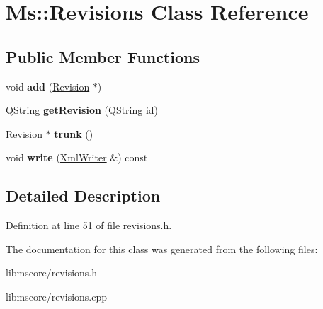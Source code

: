 \hypertarget{class_ms_1_1_revisions}{}\section{Ms\+:\+:Revisions Class Reference}
\label{class_ms_1_1_revisions}
\subsection*{Public Member Functions}
\begin{DoxyCompactItemize}
\item 
\mbox{\label{class_ms_1_1_revisions_a3e50dc594a0bae8e14b0695d8f1fc1d8}} 
void {\bfseries add} (\hyperlink{class_ms_1_1_revision}{Revision} $\ast$)
\item 
\mbox{\label{class_ms_1_1_revisions_a9f5859687be2cd3c0afe5a58cd31fb4d}} 
Q\+String {\bfseries get\+Revision} (Q\+String id)
\item 
\mbox{\label{class_ms_1_1_revisions_aefcba1e0fafe004601078a7c7946b126}} 
\hyperlink{class_ms_1_1_revision}{Revision} $\ast$ {\bfseries trunk} ()
\item 
\mbox{\label{class_ms_1_1_revisions_a23c5c373573c834511f660175e65d3f3}} 
void {\bfseries write} (\hyperlink{class_ms_1_1_xml_writer}{Xml\+Writer} \&) const
\end{DoxyCompactItemize}


\subsection{Detailed Description}


Definition at line 51 of file revisions.\+h.



The documentation for this class was generated from the following files\+:\begin{DoxyCompactItemize}
\item 
libmscore/revisions.\+h\item 
libmscore/revisions.\+cpp\end{DoxyCompactItemize}
